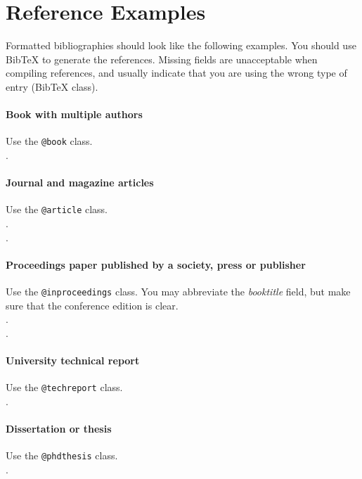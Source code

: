 \documentclass[letterpaper]{article} %
\begin{document}
\appendix
\section{Reference Examples}
\label{sec:reference_examples}

\nobibliography*
Formatted bibliographies should look like the following examples. You should use BibTeX to generate the references. Missing fields are unacceptable when compiling references, and usually indicate that you are using the wrong type of entry (BibTeX class).

\paragraph{Book with multiple authors~\nocite{em:86}} Use the \texttt{@book} class.\\[.2em]
.

\paragraph{Journal and magazine articles~\nocite{r:80, hcr:83}} Use the \texttt{@article} class.\\[.2em]
.\\[.2em]
.

\paragraph{Proceedings paper published by a society, press or publisher~\nocite{c:83, c:84}} Use the \texttt{@inproceedings} class. You may abbreviate the \emph{booktitle} field, but make sure that the conference edition is clear.\\[.2em]
.\\[.2em]
.

\paragraph{University technical report~\nocite{r:86}} Use the \texttt{@techreport} class.\\[.2em]
.

\paragraph{Dissertation or thesis~\nocite{c:79}} Use the \texttt{@phdthesis} class.\\[.2em]
.
\end{document}
